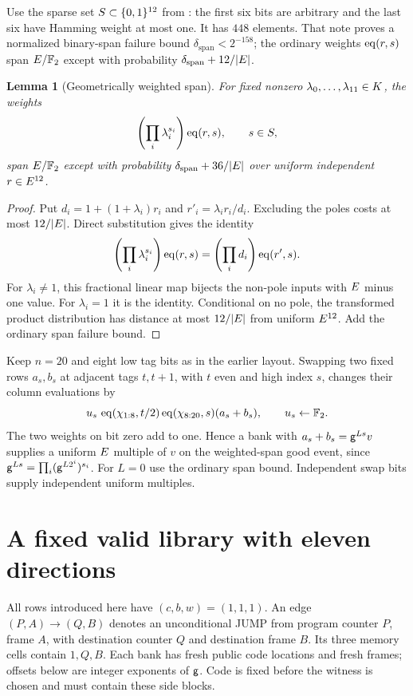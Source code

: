 \documentclass[11pt]{article}
\newtheorem{lemma}{Lemma}
\begin{document}
Use the sparse set $S\subset\{0,1\}^{12}$ from : the first six bits are arbitrary and the last six have Hamming weight at most one. It has $448$ elements. That note proves a normalized binary-span failure bound $\delta_{\mathrm{span}}<2^{-158}$; the ordinary weights $\operatorname{eq}(r,s)$ span $E/\mathbb F_2$ except with probability $\delta_{\mathrm{span}}+12/|E|$.

\begin{lemma}[Geometrically weighted span]\label{lem:metadata-span}
For fixed nonzero $\lambda_0,\ldots,\lambda_{11}\in K$, the weights
\[
 \left(\prod_i\lambda_i^{s_i}\right)\operatorname{eq}(r,s),\qquad s\in S,
\]
span $E/\mathbb F_2$ except with probability $\delta_{\mathrm{span}}+36/|E|$ over uniform independent $r\in E^{12}$.
\end{lemma}
\begin{proof}
Put $d_i=1+(1+\lambda_i)r_i$ and $r'_i=\lambda_i r_i/d_i$. Excluding the poles costs at most $12/|E|$. Direct substitution gives the identity
\[
 \left(\prod_i\lambda_i^{s_i}\right)\operatorname{eq}(r,s)
 =\left(\prod_i d_i\right)\operatorname{eq}(r',s).
\]
For $\lambda_i\ne1$, this fractional linear map bijects the non-pole inputs with $E$ minus one value. For $\lambda_i=1$ it is the identity. Conditional on no pole, the transformed product distribution has distance at most $12/|E|$ from uniform $E^{12}$. Add the ordinary span failure bound.
\end{proof}

Keep $n=20$ and eight low tag bits as in the earlier layout. Swapping two fixed rows $a_s,b_s$ at adjacent tags $t,t+1$, with $t$ even and high index $s$, changes their column evaluations by
\[
 u_s\,\operatorname{eq}(\chi_{1:8},t/2)\operatorname{eq}(\chi_{8:20},s)(a_s+b_s),
 \qquad u_s\gets\mathbb F_2.
\]
The two weights on bit zero add to one. Hence a bank with $a_s+b_s=\mathsf{g}^{Ls}v$ supplies a uniform $E$ multiple of $v$ on the weighted-span good event, since $\mathsf{g}^{Ls}=\prod_i(\mathsf{g}^{L2^i})^{s_i}$. For $L=0$ use the ordinary span bound. Independent swap bits supply independent uniform multiples.

\section{A fixed valid library with eleven directions}

All rows introduced here have $(c,b,w)=(1,1,1)$. An edge $(P,A)\to(Q,B)$ denotes an unconditional JUMP from program counter $P$, frame $A$, with destination counter $Q$ and destination frame $B$. Its three memory cells contain $1,Q,B$. Each bank has fresh public code locations and fresh frames; offsets below are integer exponents of $\mathsf{g}$. Code is fixed before the witness is chosen and must contain these side blocks.
\end{document}

